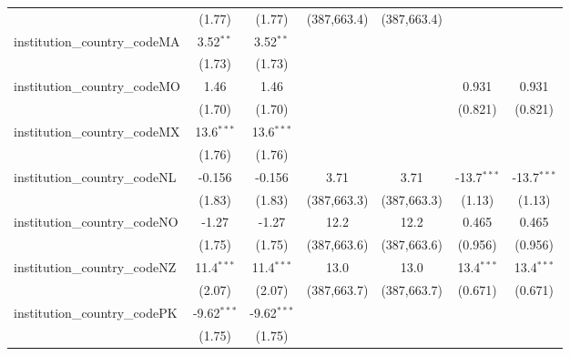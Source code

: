 \begin{tabular}{lcccccc}
                                         & (1.77)        & (1.77)        & (387,663.4)   & (387,663.4)   &               &   \\   
   institution\_country\_codeMA          & 3.52$^{**}$   & 3.52$^{**}$   &               &               &               &   \\   
                                         & (1.73)        & (1.73)        &               &               &               &   \\   
   institution\_country\_codeMO          & 1.46          & 1.46          &               &               & 0.931         & 0.931\\   
                                         & (1.70)        & (1.70)        &               &               & (0.821)       & (0.821)\\   
   institution\_country\_codeMX          & 13.6$^{***}$  & 13.6$^{***}$  &               &               &               &   \\   
                                         & (1.76)        & (1.76)        &               &               &               &   \\   
   institution\_country\_codeNL          & -0.156        & -0.156        & 3.71          & 3.71          & -13.7$^{***}$ & -13.7$^{***}$\\   
                                         & (1.83)        & (1.83)        & (387,663.3)   & (387,663.3)   & (1.13)        & (1.13)\\   
   institution\_country\_codeNO          & -1.27         & -1.27         & 12.2          & 12.2          & 0.465         & 0.465\\   
                                         & (1.75)        & (1.75)        & (387,663.6)   & (387,663.6)   & (0.956)       & (0.956)\\   
   institution\_country\_codeNZ          & 11.4$^{***}$  & 11.4$^{***}$  & 13.0          & 13.0          & 13.4$^{***}$  & 13.4$^{***}$\\   
                                         & (2.07)        & (2.07)        & (387,663.7)   & (387,663.7)   & (0.671)       & (0.671)\\   
   institution\_country\_codePK          & -9.62$^{***}$ & -9.62$^{***}$ &               &               &               &   \\   
                                         & (1.75)        & (1.75)        &               &               &               &   \\   

\end{tabular}
